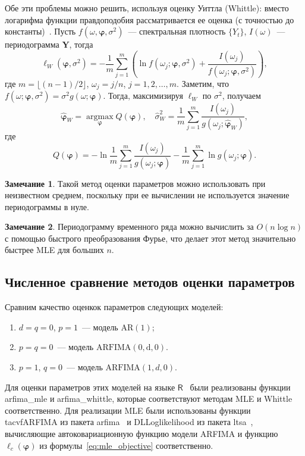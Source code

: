 \documentclass[specialist,
substylefile = spbu_report.rtx,
subf,href,colorlinks=true, 12pt]{disser}
\theoremstyle{definition}
\newtheorem{remark}{Замечание}[section]
\begin{document}
Обе эти проблемы можно решить, используя оценку Уиттла (Whittle): вместо логарифма функции правдоподобия рассматривается ее оценка (с точностью до константы)~\cite{Whittle1953}. Пусть $f(\omega, \bm\varphi, \sigma^2)$~--- спектральная плотность $\{Y_t\}$, $I(\omega)$~--- периодограмма $\bm Y$, тогда
\[
	\ell_W(\bm\varphi, \sigma^2)=-\frac1m\sum_{j=1}^m\left(\ln f(\omega_j; \bm\varphi, \sigma^2) + \frac{I(\omega_j)}{f(\omega_j; \bm\varphi, \sigma^2)}\right),
\]
где $m=\lfloor(n-1)/2\rfloor$, $\omega_j = j / n$, $j=1,2,\ldots,m$. Заметим, что $f(\omega; \bm\varphi, \sigma^2)=\sigma^2 g(\omega; \bm\varphi)$. Тогда, максимизируя $\ell_W$ по $\sigma^2$, получаем
\[
	\widehat{\bm\varphi}_W = \operatorname*{argmax}_{\bm\varphi}Q(\bm\varphi),\quad \widehat\sigma_W^2=\frac1m \sum_{j=1}^m\frac{I(\omega_j)}{g(\omega_j; \widehat{\bm\varphi}_W)},
\]
где
\[
	Q(\bm\varphi)=-\ln\frac1m \sum_{j=1}^m\frac{I(\omega_j)}{g(\omega_j; \bm\varphi)} - \frac1m \sum_{j=1}^m\ln g(\omega_j; \bm\varphi).
\]
\begin{remark}
	Такой метод оценки параметров можно использовать при неизвестном среднем, поскольку при ее вычислении не используется значение периодограммы в нуле.
\end{remark}
\begin{remark}
	Периодограмму временного ряда можно вычислить за $O(n\log n)$ с помощью быстрого преобразования Фурье, что делает этот метод значительно быстрее MLE для больших $n$.
\end{remark}
\subsection{Численное сравнение методов оценки параметров}\label{sect:est_param}
Сравним качество оценкок параметров следующих моделей:
\begin{enumerate}
	\item $d=q=0$, $p=1$~--- модель $\mathrm{AR}(1)$;
	\item $p=q=0$~--- модель $\mathrm{ARFIMA(0, d, 0)}$.
	\item $p=1$, $q=0$~--- модель $\mathrm{ARFIMA}(1, d, 0)$.
\end{enumerate}
Для оценки параметров этих моделей на языке $\mathsf{R}$~\cite{R} были реализованы функции \textsf{arfima\_mle} и \textsf{arfima\_whittle}, которые соответствуют методам MLE и Whittle соответственно. Для реализации MLE были использованы функции \textsf{tacvfARFIMA} из пакета \textsf{arfima}~\cite{Veenstra2012} и \textsf{DLLoglikelihood} из пакета \textsf{ltsa}~\cite{McLeod2007}, вычисляющие автоковариационную функцию модели ARFIMA и функцию $\ell_c(\bm\varphi)$ из формулы~\eqref{eq:mle_objective} соответственно. 
\end{document}

